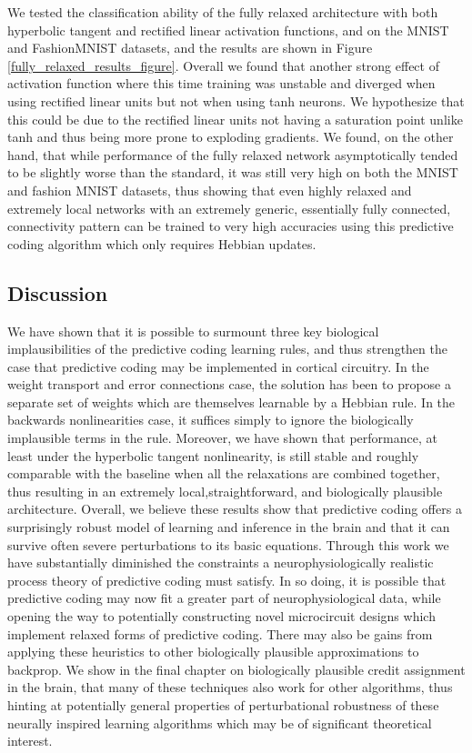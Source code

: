 We tested the classification ability of the fully relaxed architecture with both hyperbolic tangent and rectified linear activation functions, and on the MNIST and FashionMNIST datasets, and the results are shown in Figure \ref{fully_relaxed_results_figure}. Overall we found that another strong effect of activation function where this time training was unstable and diverged when using rectified linear units but not when using tanh neurons. We hypothesize that this could be due to the rectified linear units not having a saturation point unlike tanh and thus being more prone to exploding gradients. We found, on the other hand, that while performance of the fully relaxed network asymptotically tended to be slightly worse than the standard, it was still very high on both the MNIST and fashion MNIST datasets, thus showing that even highly relaxed and extremely local networks with an extremely generic, essentially fully connected, connectivity pattern can be trained to very high accuracies using this predictive coding algorithm which only requires Hebbian updates. 

\subsection{Discussion}

We have shown that it is possible to surmount three key biological implausibilities of the predictive coding learning rules, and thus strengthen the case that predictive coding may be implemented in cortical circuitry. In the weight transport and error connections case, the solution has been to propose a separate set of weights which are themselves learnable by a Hebbian rule. In the backwards nonlinearities case, it suffices simply to ignore the biologically implausible terms in the rule. Moreover, we have shown that performance, at least under the hyperbolic tangent nonlinearity, is still stable and roughly comparable with the baseline when all the relaxations are combined together, thus resulting in an extremely local,straightforward, and biologically plausible architecture. Overall, we believe these results show that predictive coding offers a surprisingly robust model of learning and inference in the brain and that it can survive often severe perturbations to its basic equations. Through this work we have substantially diminished the constraints a neurophysiologically realistic process theory of predictive coding must satisfy. In so doing, it is possible that predictive coding may now fit a greater part of neurophysiological data, while opening the way to potentially constructing novel microcircuit designs which implement relaxed forms of predictive coding.
There may also be gains from applying these heuristics to other biologically plausible approximations to backprop. We show in the final chapter on biologically plausible credit assignment in the brain, that many of these techniques also work for other algorithms, thus hinting  at potentially general properties of perturbational robustness of these neurally inspired learning algorithms which may be of significant theoretical interest. 

